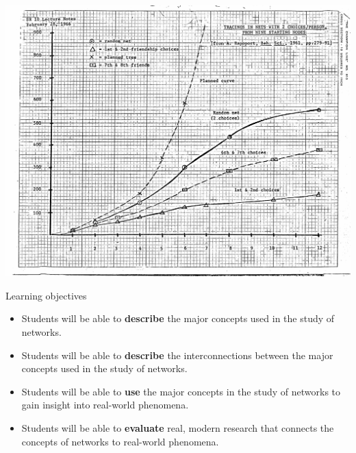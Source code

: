 \documentclass[aspectratio=169]{beamer}
\begin{document}
\begin{frame}

\begin{center}
\includegraphics[height=0.9\textheight]{figures/white_classnotes_swt}
\end{center}


\end{frame}
\begin{frame}

\begin{center}
\Large{Learning objectives}
\end{center}

\end{frame}
\begin{frame}

\begin{itemize}
\item Students will be able to \textbf{describe} the major concepts used in the study of networks.
\pause
\item Students will be able to \textbf{describe} the interconnections between the major concepts used in the study of networks.
\pause
\item Students will be able to \textbf{use} the major concepts in the study of networks to gain insight into real-world phenomena.
\pause
\item Students will be able to \textbf{evaluate} real, modern research that connects the concepts of networks to real-world phenomena.
\end{itemize}


\end{frame}
\end{document}
